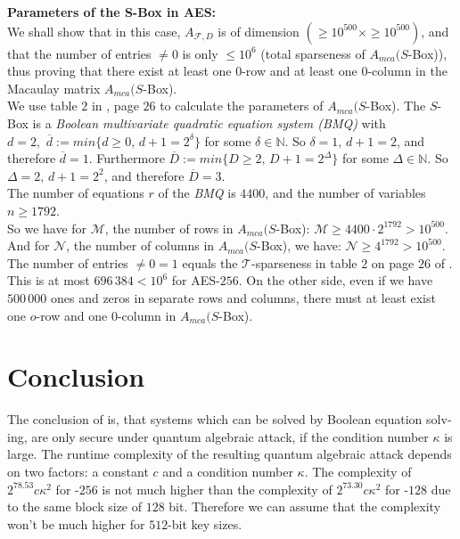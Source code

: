 \documentclass[a4paper,11pt]{article}
\begin{document}
\begin{otherlanguage}{english}
\noindent
\textbf{Parameters of the S-Box in \textsc{AES}:} \\
We shall show that in this case, $A_{\mathcal{F},D}$ is of dimension $( \geq 10^{500} \times \geq 10^{500})$, and that the number of entries $\neq 0$ is only $\leq 10^6$ (total sparseness of $A_{mca}(S$-Box)), thus proving that there exist at least one $0$-row and at least one $0$-column in the Macaulay matrix $A_{mca}(S$-Box).\\

\noindent
We use table $2$ in \cite{QAA}, page $26$ to calculate the parameters of $A_{mca}(S$-Box). The $S$-Box is a \textit{Boolean multivariate quadratic equation system (BMQ)} with $d = 2,\,\, \overline{d} := min \{d \geq 0,\, d + 1 = 2^\delta\}$ for some  $\delta \in \mathbb{N}$. So $\delta = 1, \, d + 1 = 2$, and therefore $\overline{d} = 1$. Furthermore $\overline{D}:= min \{D \geq 2, \, D + 1 = 2^\Delta\}$ for some $\Delta \in \mathbb{N}$. So $\Delta = 2, \, d + 1 = 2^2$, and therefore $\overline{D} = 3$. \\

\noindent
The number of equations $r$ of the \textit{BMQ} is $4400$, and the number of variables $n \geq 1792$. \\
So we have for $\mathcal{M}$, the number of rows in $A_{mca}(S$-Box): $\mathcal{M} \geq 4400 \cdot 2^{1792} > 10^{500}$.\\
And for $\mathcal{N}$, the number of columns in $A_{mca}(S$-Box), we have: $\mathcal{N} \geq 4^{1792} > 10^{500}$. \\

\noindent
The number of entries $\neq 0 = 1$ equals the $\mathcal{T}$-sparseness in table $2$ on page $26$ of \cite{QAA}. This is at most $696\,384 < 10^6$ for \textsc{AES}-$256$. On the other side, even if we have $500\,000$ ones and zeros in separate rows and columns, there must at least exist one $o$-row and one $0$-column in $A_{mca}(S$-Box).\\ 


\section{Conclusion}

\noindent
The conclusion of \cite{QAA} is, that systems which can be solved by Boolean equation solving, are only secure under quantum algebraic attack, if the condition number $\kappa$ is large. The runtime complexity of the resulting quantum algebraic attack depends on two factors: a constant $c$ and a condition number $\kappa$. The complexity of $2^{78.53}c\kappa^2$ for -$256$ is not much higher than the complexity of $2^{73.30}c\kappa^2$ for -$128$ due to the same block size of $128$ bit. Therefore we can assume that the complexity won't be much higher for $512$-bit key sizes.\\


\end{otherlanguage}
\end{document}
